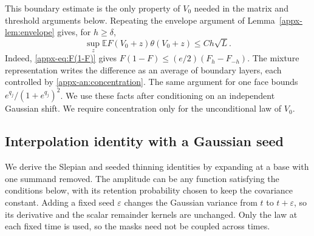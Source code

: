 \documentclass[11pt,letterpaper]{article}
\theoremstyle{remark}
\newcommand{\E}{\mathbb E}
\begin{document}
This boundary estimate is the only property of \(V_0\) needed in the
matrix and threshold arguments below. Repeating the envelope argument of
Lemma~\ref{appx-lem:envelope} gives, for \(h\ge\delta\),
\begin{equation}
 \sup_z\E F(V_0+z)\theta(V_0+z)\le Ch\sqrt L.
 \label{appx-an:weight-concentration}
\end{equation}
{Indeed, \eqref{appx-eq:F(1-F)} gives}
\(F(1-F)\le(e/2)(F_h-F_{-h})\). The mixture representation writes
the difference as an average of boundary layers, each controlled by
\eqref{appx-an:concentration}. The same argument for one face bounds
\(e^{q_j}/(1+e^{q_j})^2\). We use these facts after conditioning on
an independent Gaussian shift. We require concentration only for the
unconditional law of \(V_0\).

\subsection{Interpolation identity with a Gaussian seed}
\label{appx-an:sec:path}

We derive the Slepian and seeded thinning identities by expanding at
a base with one summand removed. The amplitude can be any function
satisfying the conditions below, with its retention probability chosen
to keep the covariance constant. Adding a fixed seed \(\varepsilon\)
changes the Gaussian variance from \(t\) to \(t+\varepsilon\),
so its derivative and the scalar remainder kernels are unchanged.
Only the law at each fixed time is used, so the masks need not be
coupled across times.
\end{document}
